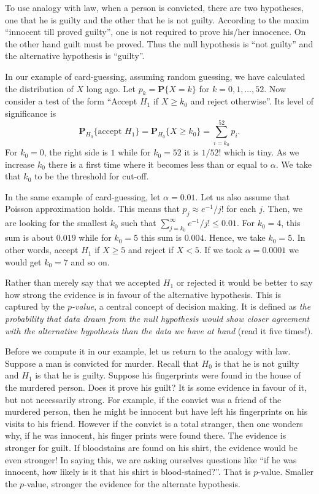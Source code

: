\documentclass[preprint,  11pt]{amsart}
\newcommand{\para}[1]{\vspace{4mm}\noindent{\bfseries #1:}}
\theoremstyle{plain} %
\theoremstyle{definition} %
\begin{document}
To use analogy with law, when a person is convicted, there are two hypotheses, one that he is guilty and the other that he is not guilty. According to the maxim ``innocent till proved guilty'', one is not required to prove his/her innocence. On the other hand guilt must be proved. Thus the null hypothesis is ``not guilty'' and the alternative hypothesis is ``guilty''. 


In our example of card-guessing, assuming random guessing, we have calculated the distribution of $X$ long ago. Let $p_{k}=\mathbf{P}\{X=k\}$ for $k=0,1,\ldots ,52$.  Now consider a test of the form ``Accept $H_{1}$ if $X\ge k_{0}$ and reject otherwise''. Its level of significance is
$$
\mathbf{P}_{H_{0}}\{\mbox{accept }H_{1}\} = \mathbf{P}_{H_{0}}\{X\ge k_{0}\} = \sum_{i=k_{0}}^{52}p_{i}.
$$
For $k_{0}=0$, the right side is $1$ while for $k_{0}=52$ it is $1/52!$ which is tiny. As we increase $k_{0}$ there is a first time where it becomes less than or equal to $\alpha$. We take that $k_{0}$ to be the threshold for cut-off.

 In the same example of card-guessing, let $\alpha=0.01$. Let us also assume that Poisson approximation holds. This means that $p_{j}\approx e^{-1}/j! $ for each $j$. Then, we are looking for the smallest $k_{0}$ such that $\sum_{j=k_{0}}^{\infty}e^{-1}/j! \le 0.01$. For $k_{0}=4$, this sum is about $0.019$ while for $k_{0}=5$ this sum is $0.004$. Hence, we take $k_{0}=5$. In other words, accept $H_{1}$ if $X\ge 5$ and reject if $X<5$. If we took $\alpha=0.0001$ we would get $k_{0}=7$ and so on.

\para{Strength of evidence} Rather than merely say that we accepted $H_{1}$ or rejected it would be better to say how strong the evidence is in favour of the alternative hypothesis. This is captured by the {\em $p$-value}, a central concept of decision making. It is defined as {\em the probability that data drawn from the null hypothesis would show closer agreement with the alternative hypothesis than the data we have at hand} (read it five times!).

Before we compute it in our example, let us return to the analogy with law. Suppose  a man is convicted for murder. Recall that $H_{0}$ is that he is not guilty and $H_{1}$ is that he is guilty. Suppose his fingerprints were found in the house of the murdered person. Does it prove his guilt? It is some evidence in favour of it, but not necessarily strong. For example, if the convict was a friend of the murdered person, then he might be innocent but have left his fingerprints on his visits to his friend. However if the convict is a total stranger, then one wonders why, if he was innocent, his finger prints were found there. The evidence is stronger for guilt. If bloodstains are found on his shirt, the evidence would be even stronger! In saying this, we are  asking ourselves questions like ``if he was innocent, how likely is it that his shirt is blood-stained?''. That is $p$-value. Smaller the $p$-value, stronger the evidence for the alternate hypothesis.
\end{document}
